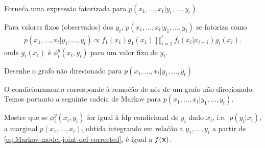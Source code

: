 \begin{exenumerate}
    
    \item Forne\'ca uma express\~ao fatorizada para $ p(x_1, \ldots, x_t | y_1, \ldots, y_t)$
    
    \begin{solution}
        Para valores fixos (observados) dos $y_i$, $p(x_1, \ldots, x_t |
        y_1, \ldots, y_t)$ se fatoriza como
        \begin{align}
            p(x_1, \ldots, x_t | y_1, \ldots, y_t) \propto f_1(x_1) g_1(x_1)
            \prod_{i=2}^t f_i(x_i|x_{i-1}) g_i(x_i).
        \end{align}
        onde $g_i(x_i)$ \'e $\phi^y_i(x_i,y_i)$ para um valor fixo de $y_i$.
    \end{solution}
    
    \item Desenhe o grafo n\~ao direcionado para $p(x_1, \ldots, x_t | y_1, \ldots, y_t)$
    \begin{solution}
        O condicionamento corresponde \`a remo\'c\~ao de n\'os de um grafo n\~ao
        direcionado. Temos portanto a seguinte cadeia de Markov para $p(x_1, \ldots,
        x_t | y_1, \ldots, y_t)$.
        
        \begin{center}
        \end{center}
        
    \end{solution}
    
    \item Mostre que se $\phi_i^y(x_i, y_i)$ for igual \`a fdp condicional de
    $y_i$ dado $x_i$, i.e.\ $p(y_i|x_i)$, a marginal $p(x_1, \ldots, x_t)$,
    obtida integrando em rela\'c\~ao a $y_1, \ldots, y_t$ a partir de
    \eqref{eq:Markov-model-joint-def-corrected}, \'e igual a $f(\mathbf{x})$.
    

\end{exenumerate}
